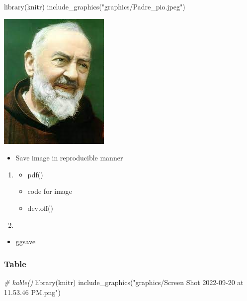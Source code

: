 \documentclass[
]{article}
\newenvironment{Shaded}{\begin{snugshade}}{\end{snugshade}}
\newcommand{\CommentTok}[1]{\textcolor[rgb]{0.56,0.35,0.01}{\textit{#1}}}
\newcommand{\FunctionTok}[1]{\textcolor[rgb]{0.00,0.00,0.00}{#1}}
\newcommand{\NormalTok}[1]{#1}
\newcommand{\StringTok}[1]{\textcolor[rgb]{0.31,0.60,0.02}{#1}}
\providecommand{\tightlist}{%
  \setlength{\itemsep}{0pt}\setlength{\parskip}{0pt}}
\begin{document}
\begin{Shaded}
\begin{Highlighting}[]
\FunctionTok{library}\NormalTok{(knitr)}
\FunctionTok{include\_graphics}\NormalTok{(}\StringTok{"graphics/Padre\_pio.jpeg"}\NormalTok{)}
\end{Highlighting}
\end{Shaded}

\includegraphics{graphics/Padre_pio.jpeg}

\begin{itemize}
\tightlist
\item
  Save image in reproducible manner
\end{itemize}

\begin{enumerate}
\def\labelenumi{\arabic{enumi}.}
\item
  \begin{itemize}
  \tightlist
  \item
    pdf()
  \item
    code for image
  \item
    dev.off()
  \end{itemize}
\item
\end{enumerate}

\begin{itemize}
\tightlist
\item
  ggsave
\end{itemize}

\hypertarget{table}{%
\subsubsection{Table}\label{table}}

\begin{Shaded}
\begin{Highlighting}[]
\CommentTok{\# kable()}
\FunctionTok{library}\NormalTok{(knitr)}
\FunctionTok{include\_graphics}\NormalTok{(}\StringTok{"graphics/Screen Shot 2022{-}09{-}20 at 11.53.46 PM.png"}\NormalTok{)}
\end{Highlighting}
\end{Shaded}
\end{document}
